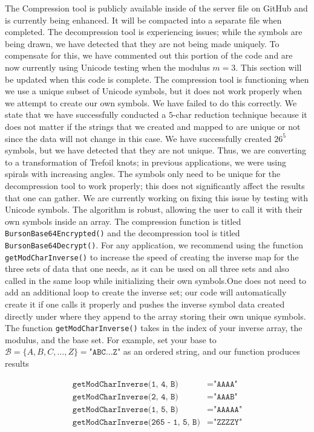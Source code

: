 \documentclass[amsmath,12pt,a4paper]{amsart}
\begin{document}
The Compression tool is publicly available inside of the server file on GitHub and is currently being enhanced. It will be compacted into a separate file when completed. The decompression tool is experiencing issues; while the symbols are being drawn, we have detected that they are not being made uniquely. To compensate for this, we have commented out this portion of the code and are now currently using Unicode testing when the modulus \( m = 3 \). This section will be updated when this code is complete. The compression tool is functioning when we use a unique subset of Unicode symbols, but it does not work properly when we attempt to create our own symbols. We have failed to do this correctly. We state that we have successfully conducted a $5$-char reduction technique because it does not matter if the strings that we created and mapped to are unique or not since the data will not change in this case. We have successfully created $26^5$ symbols, but we have detected that they are not unique. Thus, we are converting to a transformation of Trefoil knots; in previous applications, we were using spirals with increasing angles. The symbols only need to be unique for the decompression tool to work properly; this does not significantly affect the results that one can gather. We are currently working on fixing this issue by testing with Unicode symbols. The algorithm is robust, allowing the user to call it with their own symbols inside an array. The compression function is titled \texttt{BursonBase64Encrypted()} and the decompression tool is titled \texttt{BursonBase64Decrypt()}. For any application, we recommend using the function \texttt{getModCharInverse()} to increase the speed of creating the inverse map for the three sets of data that one needs, as it can be used on all three sets and also called in the same loop while initializing their own symbols.One does not need to add an additional loop to create the inverse set; our code will automatically create it if one calls it properly and pushes the inverse symbol data created directly under where they append to the array storing their own unique symbols. The function \texttt{getModCharInverse()} takes in the index of your inverse array, the modulus, and the base set. For example, set your base to \( \mathcal{B} = \{ A, B, C, \ldots, Z \} = \texttt{"ABC...Z"} \) as an ordered string, and our function produces results

\begin{align*}
\texttt{getModCharInverse(1, 4, B)} &= \texttt{"AAAA"} \\
\texttt{getModCharInverse(2, 4, B)} &= \texttt{"AAAB"} \\
\texttt{getModCharInverse(1, 5, B)} &= \texttt{"AAAAA"} \\
\texttt{getModCharInverse(265 - 1, 5, B)} &= \texttt{"ZZZZY"}
\end{align*}
\end{document}
